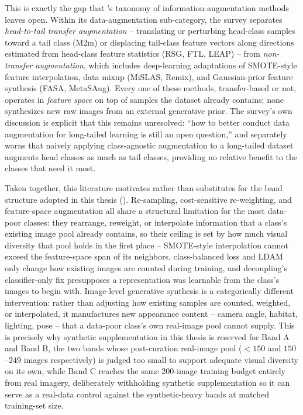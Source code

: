 This is exactly the gap that \citeauthor{zhangDeepLongTailedLearning2023}'s taxonomy of information-augmentation methods \cite{zhangDeepLongTailedLearning2023} leaves open. Within its data-augmentation sub-category, the survey separates \textit{head-to-tail transfer augmentation} -- translating or perturbing head-class samples toward a tail class (M2m) or displacing tail-class feature vectors along directions estimated from head-class feature statistics (RSG, FTL, LEAP) -- from \textit{non-transfer augmentation}, which includes deep-learning adaptations of SMOTE-style feature interpolation, data mixup (MiSLAS, Remix), and Gaussian-prior feature synthesis (FASA, MetaSAug). Every one of these methods, transfer-based or not, operates in \textit{feature space} on top of samples the dataset already contains; none synthesizes new raw images from an external generative prior. The survey's own discussion is explicit that this remains unresolved: \enquote{how to better conduct data augmentation for long-tailed learning is still an open question,} and separately warns that naively applying class-agnostic augmentation to a long-tailed dataset augments head classes as much as tail classes, providing no relative benefit to the classes that need it most.

Taken together, this literature motivates rather than substitutes for the band structure adopted in this thesis (). Re-sampling, cost-sensitive re-weighting, and feature-space augmentation all share a structural limitation for the most data-poor classes: they rearrange, reweight, or interpolate information that a class's existing image pool already contains, so their ceiling is set by how much visual diversity that pool holds in the first place -- SMOTE-style interpolation cannot exceed the feature-space span of its neighbors, class-balanced loss and LDAM only change how existing images are counted during training, and decoupling's classifier-only fix presupposes a representation was learnable from the class's images to begin with. Image-level generative synthesis is a categorically different intervention: rather than adjusting how existing samples are counted, weighted, or interpolated, it manufactures new appearance content -- camera angle, habitat, lighting, pose -- that a data-poor class's own real-image pool cannot supply. This is precisely why synthetic supplementation in this thesis is reserved for Band A and Band B, the two bands whose post-curation real-image pool ($<150$ and $150$--$249$ images respectively) is judged too small to support adequate visual diversity on its own, while Band C reaches the same $200$-image training budget entirely from real imagery, deliberately withholding synthetic supplementation so it can serve as a real-data control against the synthetic-heavy bands at matched training-set size.
